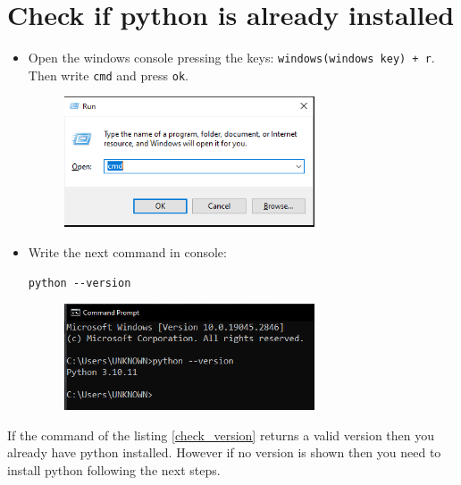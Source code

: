 \documentclass[12pt]{article}
\begin{document}
\setcounter{page}{1}%

\section{Check if python is already installed}\label{sec:check}
\begin{itemize}
	\item  {Open the windows console pressing the keys: \texttt{windows(windows key) + r}. Then write \texttt{cmd} and press \texttt{ok}.

	      \begin{figure}[H]
		      \centering
		      \includegraphics[width =0.7\textwidth ,keepaspectratio]{imgs/open_console.png}
		      \caption{}
	      \end{figure}
	      }

	\item  {Write the next command in console:

	      \begin{lstlisting}[caption=\phantom{},style=conlst,label={check_version}]
python --version
\end{lstlisting}

	      \begin{figure}[H]
		      \centering
		      \includegraphics[width =0.7\textwidth ,keepaspectratio]{imgs/check_python.png}
		      \caption{}
	      \end{figure}

	      }
\end{itemize}

If the command of the listing \ref{check_version} returns a valid version then you already have python installed.
However if no version is shown then you need to install python following the next steps.
\end{document}
